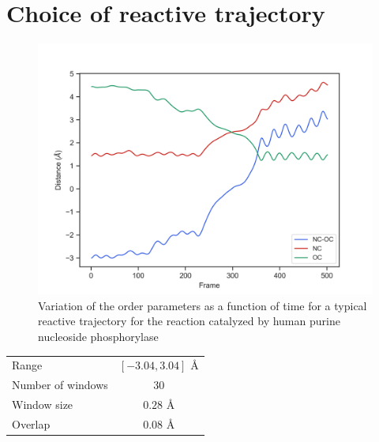 \documentclass{report}
\begin{document}
\section{Choice of reactive trajectory}
\begin{figure}[ht!]
\centering
\includegraphics[scale=0.75]{figures/dis_nc-oc-90.png}
\caption{Variation of the order parameters as a function of time for a typical 
reactive trajectory for the reaction catalyzed by human purine nucleoside phosphorylase}
\label{fig:fig}
\end{figure}

\begin{center}
  \begin{tabular}{ l | c  }
    \hline
    Range & $\left[-3.04,3.04\right]$ {\AA}\\ 
    Number of windows & 30  \\ 
    Window size & $0.28$ {\AA} \\
    Overlap & 0.08 {\AA} \\
    \hline
  \end{tabular}
\end{center}
\end{document}
